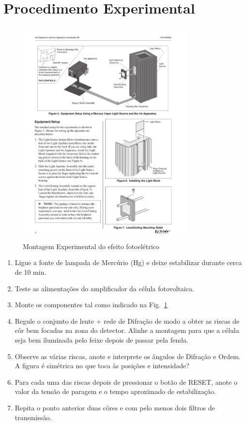 \documentclass[a4paper,12pt]{article}  %
\begin{document}
\section{\sf Procedimento Experimental}

\begin{figure}[htb] 
	\centering 
	\includegraphics[width=0.8\textwidth]{planckPasco} 
	\caption{Montagem Experimental do efeito fotoelétrico} 
	\label{fig:plackPasco}
\end{figure}

\begin{enumerate}
\item Ligue a fonte de lampada de Mercúrio (Hg) e deixe estabilizar durante cerca de 10 min.
\item Teste as alimentações do amplificador da célula fotovoltaica.
\item Monte os componentes tal como indicado na Fig.~\ref{fig:plackPasco}
\item Regule o conjunto de lente + rede de Difração de modo a obter as riscas de côr bem focadas na zona do detector. Alinhe a montagem para que a célula seja bem iluminada pelo feixe depois de passar pela fenda.
\item Observe as várias riscas, anote e interprete os ângulos de Difração e Ordem. A figura é simétrica  no que toca às posições e  intensidade?
\item Para cada uma das riscas depois de pressionar o botão de RESET, anote o valor da tensão de paragem e o tempo aproximado de estabilização.
\item Repita o ponto anterior duas côres e com pelo menos dois filtros de transmissão.
\end{enumerate}
\end{document}
